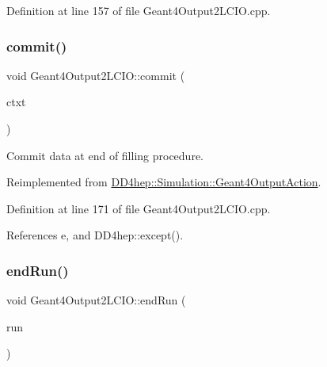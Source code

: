 Definition at line 157 of file Geant4\+Output2\+L\+C\+I\+O.\+cpp.

\hypertarget{class_d_d4hep_1_1_simulation_1_1_geant4_output2_l_c_i_o_a86575064911453b387f237077fa8a969}{}\label{class_d_d4hep_1_1_simulation_1_1_geant4_output2_l_c_i_o_a86575064911453b387f237077fa8a969} 
\subsubsection{\texorpdfstring{commit()}{commit()}}
{\footnotesize\ttfamily void Geant4\+Output2\+L\+C\+I\+O\+::commit (\begin{DoxyParamCaption}\item[{\hyperlink{class_d_d4hep_1_1_simulation_1_1_geant4_output_action_1_1_output_context}{Output\+Context}$<$ G4\+Event $>$ \&}]{ctxt }\end{DoxyParamCaption})\hspace{0.3cm}{\ttfamily [virtual]}}



Commit data at end of filling procedure. 



Reimplemented from \hyperlink{class_d_d4hep_1_1_simulation_1_1_geant4_output_action_a1d83299b79de6a1a75e70ef5a9e4d3eb}{D\+D4hep\+::\+Simulation\+::\+Geant4\+Output\+Action}.



Definition at line 171 of file Geant4\+Output2\+L\+C\+I\+O.\+cpp.



References e, and D\+D4hep\+::except().

\hypertarget{class_d_d4hep_1_1_simulation_1_1_geant4_output2_l_c_i_o_a9365b2b05b745a7807ce06163a7977fb}{}\label{class_d_d4hep_1_1_simulation_1_1_geant4_output2_l_c_i_o_a9365b2b05b745a7807ce06163a7977fb} 
\subsubsection{\texorpdfstring{end\+Run()}{endRun()}}
{\footnotesize\ttfamily void Geant4\+Output2\+L\+C\+I\+O\+::end\+Run (\begin{DoxyParamCaption}\item[{const G4\+Run $\ast$}]{run }\end{DoxyParamCaption})\hspace{0.3cm}{\ttfamily [virtual]}}




